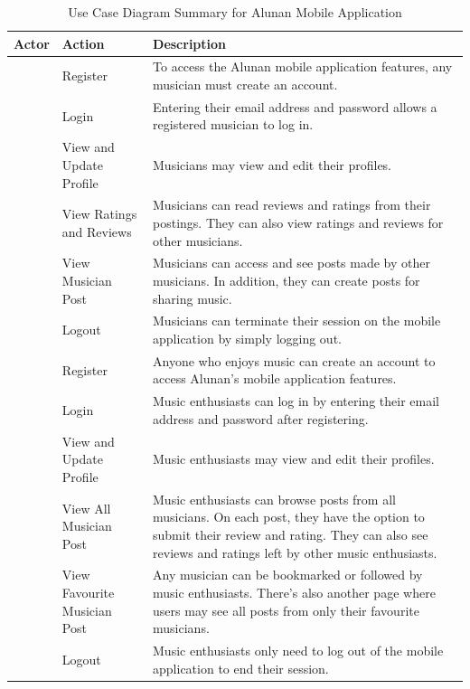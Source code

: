 \begin{table}[ht]
    \centering
    \caption{Use Case Diagram Summary for Alunan Mobile Application}
    \begin{tabular}
        {|>{\raggedright}p{2cm}|>{\raggedright}p{4cm}|>{\raggedright\arraybackslash}p{7cm}|}
    \hline
    \textbf{Actor} & \textbf{Action} & \textbf{Description} \\
    \hline
    \multirow{6}{2cm}{\vspace{-4cm}Musician} & Register & To access the Alunan mobile application features, any musician must create an account. \\
    \cline{2-3}
     & Login & Entering their email address and password allows a registered musician to log in. \\
    \cline{2-3}
     & View and Update Profile & Musicians may view and edit their profiles. \\
    \cline{2-3}
     & View Ratings and Reviews & Musicians can read reviews and ratings from their postings. They can also view ratings and reviews for other musicians. \\
    \cline{2-3}
     & View Musician Post & Musicians can access and see posts made by other musicians. In addition, they can create posts for sharing music. \\
    \cline{2-3}
     & Logout & Musicians can terminate their session on the mobile application by simply logging out. \\
    \hline
    \multirow{6}{2cm}{\vspace{-5cm}Enthusiast} & Register & Anyone who enjoys music can create an account to access Alunan's mobile application features. \\
    \cline{2-3}
     & Login & Music enthusiasts can log in by entering their email address and password after registering. \\
    \cline{2-3}
     & View and Update Profile & Music enthusiasts may view and edit their profiles. \\
    \cline{2-3}
     & View All Musician Post & Music enthusiasts can browse posts from all musicians. On each post, they have the option to submit their review and rating. They can also see reviews and ratings left by other music enthusiasts. \\
    \cline{2-3}
     & View Favourite Musician Post & Any musician can be bookmarked or followed by music enthusiasts. There's also another page where users may see all posts from only their favourite musicians. \\
    \cline{2-3}
     & Logout & Music enthusiasts only need to log out of the mobile application to end their session. \\
    \hline
    \end{tabular}
\end{table}
\pagebreak

